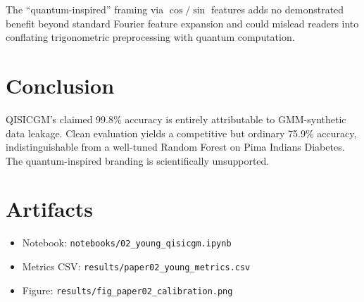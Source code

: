 \documentclass[12pt,a4paper]{article}
\begin{document}
The ``quantum-inspired'' framing via $\cos/\sin$ features adds no demonstrated benefit beyond standard Fourier feature expansion and could mislead readers into conflating trigonometric preprocessing with quantum computation.

\section{Conclusion}
QISICGM's claimed 99.8\% accuracy is entirely attributable to GMM-synthetic data leakage. Clean evaluation yields a competitive but ordinary 75.9\% accuracy, indistinguishable from a well-tuned Random Forest on Pima Indians Diabetes. The quantum-inspired branding is scientifically unsupported.

\appendix
\section{Artifacts}
\begin{itemize}
  \item Notebook: \texttt{notebooks/02\_young\_qisicgm.ipynb}
  \item Metrics CSV: \texttt{results/paper02\_young\_metrics.csv}
  \item Figure: \texttt{results/fig\_paper02\_calibration.png}
\end{itemize}
\end{document}
